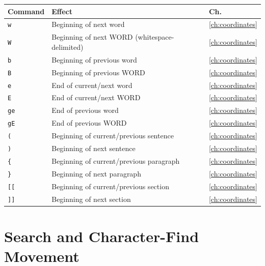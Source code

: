 \begin{longtable}{@{}l p{9cm} l@{}}
\textbf{Command} & \textbf{Effect} & \textbf{Ch.} \\
\hline
\endhead
\texttt{w} & Beginning of next word & \ref{ch:coordinates} \\
\texttt{W} & Beginning of next WORD (whitespace-delimited) & \ref{ch:coordinates} \\
\texttt{b} & Beginning of previous word & \ref{ch:coordinates} \\
\texttt{B} & Beginning of previous WORD & \ref{ch:coordinates} \\
\texttt{e} & End of current/next word & \ref{ch:coordinates} \\
\texttt{E} & End of current/next WORD & \ref{ch:coordinates} \\
\texttt{ge} & End of previous word & \ref{ch:coordinates} \\
\texttt{gE} & End of previous WORD & \ref{ch:coordinates} \\
\texttt{(} & Beginning of current/previous sentence & \ref{ch:coordinates} \\
\texttt{)} & Beginning of next sentence & \ref{ch:coordinates} \\
\texttt{\{} & Beginning of current/previous paragraph & \ref{ch:coordinates} \\
\texttt{\}} & Beginning of next paragraph & \ref{ch:coordinates} \\
\texttt{[[} & Beginning of current/previous section & \ref{ch:coordinates} \\
\texttt{]]} & Beginning of next section & \ref{ch:coordinates} \\
\end{longtable}

\section{Search and Character-Find Movement}

